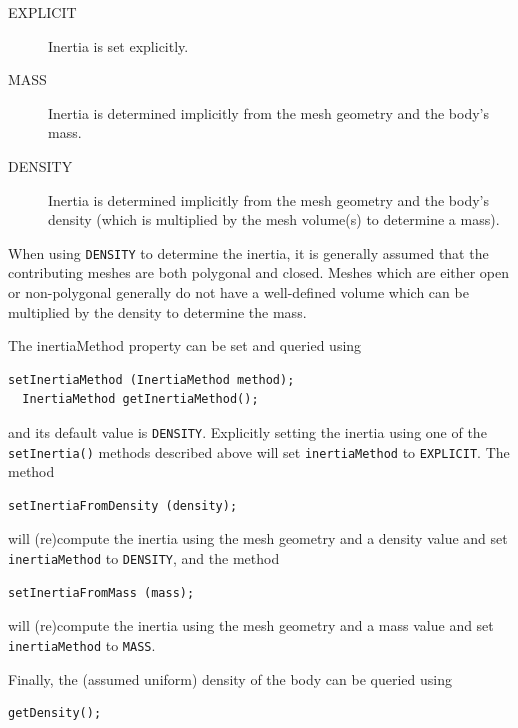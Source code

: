 \begin{description}

\item[EXPLICIT]\mbox{}

Inertia is set explicitly.

\item[MASS]\mbox{}

Inertia is determined implicitly from the mesh geometry and the body's
mass.

\item[DENSITY]\mbox{}

Inertia is determined implicitly from the mesh geometry and the body's
density (which is multiplied by the mesh volume(s) to determine a
mass).

\end{description}

\begin{sideblock}
When using {\tt DENSITY} to determine the inertia, it is generally
assumed that the contributing meshes are both polygonal and
closed. Meshes which are either open or non-polygonal generally do not
have a well-defined volume which can be multiplied by the density to
determine the mass.
\end{sideblock}

The {\sf inertiaMethod} property can be set and queried using
\begin{lstlisting}[]
  setInertiaMethod (InertiaMethod method);
  InertiaMethod getInertiaMethod();
\end{lstlisting}
%
and its default value is {\tt DENSITY}. Explicitly setting the
inertia using one of the {\tt setInertia()} methods described above will
set {\tt inertiaMethod} to {\tt EXPLICIT}. The method
\begin{lstlisting}[]
  setInertiaFromDensity (density); 
\end{lstlisting}
%
will (re)compute the inertia using the mesh geometry and a density value
and set {\tt inertiaMethod} to {\tt DENSITY}, and
the method
\begin{lstlisting}[]
  setInertiaFromMass (mass); 
\end{lstlisting}
%
will (re)compute the inertia using the mesh geometry and a mass value
and set {\tt inertiaMethod} to {\tt MASS}.

Finally, the (assumed uniform) density of the body can be queried
using
\begin{lstlisting}[]
   getDensity();
\end{lstlisting}
%

